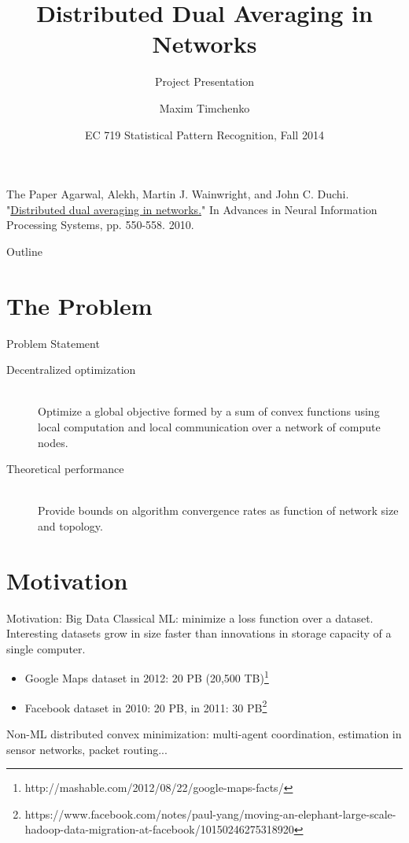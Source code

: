 \documentclass{beamer}
\title{Distributed Dual Averaging in Networks}
\subtitle{Project Presentation}
\author{Maxim Timchenko}
\institute{Electrical and Computer Engineering Department\\Boston University}
\date{EC 719 Statistical Pattern Recognition, Fall 2014}
\begin{document}
	\begin{frame}
		\titlepage
	\end{frame}
	
	\begin{frame}{The Paper}
		Agarwal, Alekh, Martin J. Wainwright, and John C. Duchi. 
		"\href{http://web.stanford.edu/~jduchi/projects/DuchiAgWa10_nips.pdf}{Distributed dual averaging in networks.}" 
		In Advances in Neural Information Processing Systems, pp. 550-558. 2010.		
	\end{frame}
	
	\begin{frame}{Outline}
		\tableofcontents
	\end{frame}
	
	\section{The Problem}
	\begin{frame}{Problem Statement}
		\begin{description}
  			\item[Decentralized optimization]\hfill \\ Optimize a global objective
			formed by a sum of convex functions using local computation
			and local communication over a network of compute nodes.
			\pause
			\item[Theoretical performance] \hfill \\ Provide bounds on algorithm 
			convergence rates as function of network size and topology.
		\end{description}
	\end{frame}
	
	\section{Motivation}
	\begin{frame}{Motivation: Big Data}
		Classical ML: minimize a loss function over a dataset.\\
		Interesting datasets grow in size faster than innovations in 
		storage capacity of a single computer.
		\begin{itemize}
			\item Google Maps dataset in 2012: 20 PB (20,500 TB)\footnote{http://mashable.com/2012/08/22/google-maps-facts/}
			\item Facebook dataset in 2010: 20 PB, in 2011: 30 PB\footnote{https://www.facebook.com/notes/paul-yang/moving-an-elephant-large-scale-hadoop-data-migration-at-facebook/10150246275318920}
		\end{itemize}
		Non-ML distributed convex minimization: 
		multi-agent coordination, estimation in sensor networks,
		packet routing...
	\end{frame}	
\end{document}
